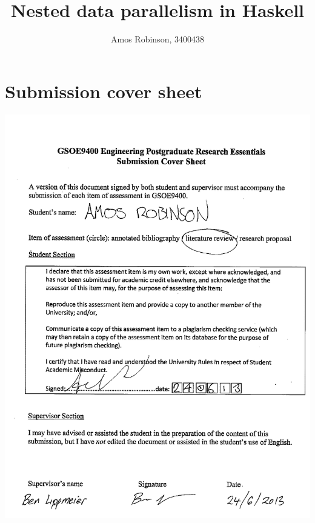 \documentclass[12pt,a4paper]{article}
\author{Amos Robinson, 3400438}
\title{Nested data parallelism in Haskell}
\begin{document}
\maketitle
\thispagestyle{fancy}


\onehalfspacing
\tableofcontents

\newcommand{\nesl}{{\sc Nesl}}
\newcommand{\vcode}{{\sc Vcode}}

\section{Submission cover sheet}
\includegraphics{submissioncoversheet.png}
\end{document}
